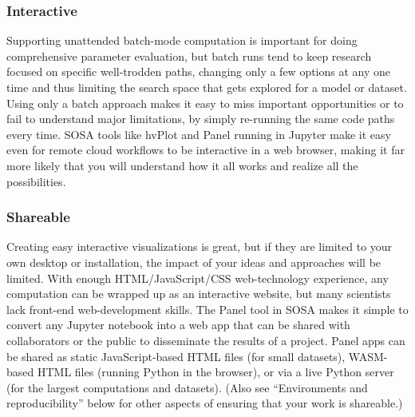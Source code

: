 \subsubsection{Interactive}
Supporting unattended batch-mode computation is important for doing comprehensive parameter evaluation, but batch runs tend to keep research focused on specific well-trodden paths, changing only a few options at any one time and thus limiting the search space that gets explored for a model or dataset. Using only a batch approach makes it easy to miss important opportunities or to fail to understand major limitations, by simply re-running the same code paths every time. SOSA tools like hvPlot and Panel running in Jupyter make it easy even for remote cloud workflows to be interactive in a web browser, making it far more likely that you will understand how it all works and realize all the possibilities.

\subsubsection{Shareable}
Creating easy interactive visualizations is great, but if they are limited to your own desktop or installation, the impact of your ideas and approaches will be limited. With enough HTML/JavaScript/CSS web-technology experience, any computation can be wrapped up as an interactive website, but many scientists lack front-end web-development skills. The Panel tool in SOSA makes it simple to convert any Jupyter notebook into a web app that can be shared with collaborators or the public to disseminate the results of a project. Panel apps can be shared as static JavaScript-based HTML files (for small datasets), WASM-based HTML files (running Python in the browser), or via a live Python server (for the largest computations and datasets). (Also see ``Environments and reproducibility'' below for other aspects of ensuring that your work is shareable.)

